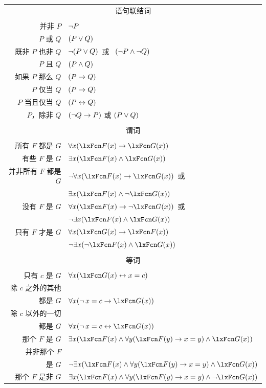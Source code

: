 \begin{center}
\label{app.symbolization}
\begin{tabular*}{\textwidth}{rl}
\multicolumn{2}{c}{\textsc{语句联结词}}\\ \\
并非 $P$ & $\neg P$\\
$P$ 或 $Q$ & $(P \vee Q)$\\
既非 $P$ 也非 $Q$ & $\neg(P \vee Q)$\ 或 \ $(\neg P \wedge \neg Q)$\\
$P$ 且 $Q$ & $(P \wedge Q)$\\
如果 $P$ 那么 $Q$ & $(P \rightarrow Q)$\\
$P$ 仅当 $Q$ & $(P \rightarrow Q)$\\
$P$ 当且仅当 $Q$ & $(P \leftrightarrow Q)$\\
$P$，除非 $Q$ & $(\neg Q \rightarrow P)$ 或 $(P \vee Q)$\\
\\
\multicolumn{2}{c}{\label{SymbolizingPredicates}\textsc{谓词}}\\ \\
所有 $F$ 都是 $G$ & $\forall x(\atom{F}{x} \eif \atom{G}{x})$\\
有些 $F$ 是 $G$ & $\exists x(\atom{F}{x} \eand \atom{G}{x})$\\
并非所有 $F$ 都是 $G$ & $\enot\forall x(\atom{F}{x} \eif \atom{G}{x})$\ 或\\
& $\exists x(\atom{F}{x} \eand \enot \atom{G}{x})$\\
没有 $F$ 是 $G$ & $\forall x(\atom{F}{x} \eif\enot \atom{G}{x})$\ 或\\
& $\enot\exists x(\atom{F}{x} \eand \atom{G}{x})$\\
只有 $F$ 才是 $G$ & $\forall x(\atom{G}{x} \eif \atom{F}{x})$\\
& $\enot\exists x(\enot\atom{F}{x} \eand \atom{G}{x})$\\
\\
\multicolumn{2}{c}{\textsc{等词}}\\ \\
只有 $c$ 是 $G$ & $\forall x(\atom{G}{x} \eiff x=c)$\\
除 $c$ 之外的其他\\都是 $G$ & $\forall x(\enot\, {x = c} \eif \atom{G}{x} )$\\
除 $c$ 以外的一切\\都是 $G$ & $\forall x(\enot\, {x = c} \eiff \atom{G}{x} )$\\
那个 $F$ 是 $G$ & $\exists x(\atom{F}{x} \eand \forall y(\atom{F}{y} \eif x=y) \eand \atom{G}{x} )$\\
并非那个 $F$\\是 $G$ & $\enot\exists x(\atom{F}{x} \eand \forall y(\atom{F}{y} \eif x=y) \eand \atom{G}{x} )$\\
那个 $F$ 是非 $G$ & $\exists x(\atom{F}{x} \eand \forall y(\atom{F}{y} \eif x=y) \eand \enot \atom{G}{x} )$
\end{tabular*}
\end{center}

